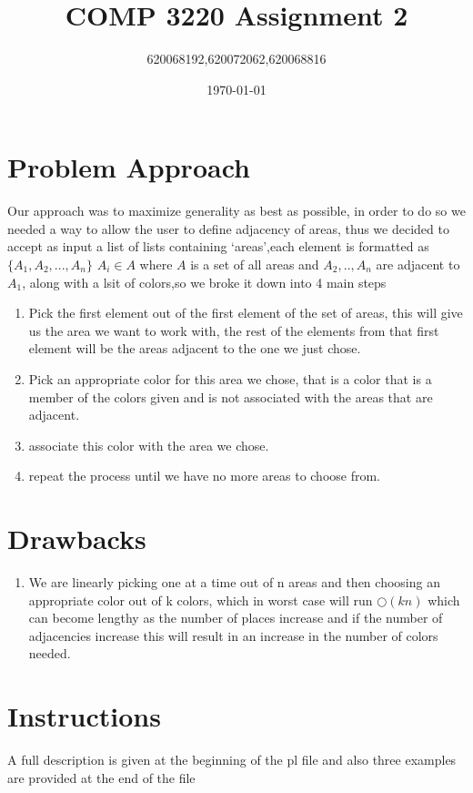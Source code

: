 \documentclass[10pt]{article}
\begin{document}
\title{COMP 3220 Assignment 2}
\author{620068192,620072062,620068816}
\date{\today}
\maketitle

\section*{Problem Approach}

Our approach was to maximize generality as best as possible, in order to do so we needed a way to allow the user to define adjacency of areas, thus we decided to accept as input a list of lists containing ‘areas’,each element is formatted as $\{A_1,A_2,...,A_n\}$ $A_i \in A$ where $A$ is a set of all areas and $A_2,..,A_n$ are adjacent to $A_1$, along with a lsit of colors,so we broke it down into 4 main steps
\begin{enumerate}
	\item Pick the first element out of the first element of the set of areas, this will give us the area we want to work with, the rest of the elements from that first element will be the areas adjacent to the one we just chose.
	\item Pick an appropriate color for this area we chose, that is a color that is a member of the colors given and is not associated with the areas that are adjacent.
	\item associate this color with the area we chose.
	\item repeat the process until we have no more areas to choose from.
\end{enumerate} 

\section*{Drawbacks}
\begin{enumerate}
\item We are linearly picking one at a time out of n areas and then choosing an appropriate color out of k colors, which in worst case will run $\bigcirc(kn)$ which can become lengthy as the number of places increase and if the number of adjacencies increase this will result in an increase in the number of colors needed. 
\end{enumerate}
\section*{Instructions}
A full description is given at the beginning of the pl file and also three examples are provided at the end of the file 
\end{document}
